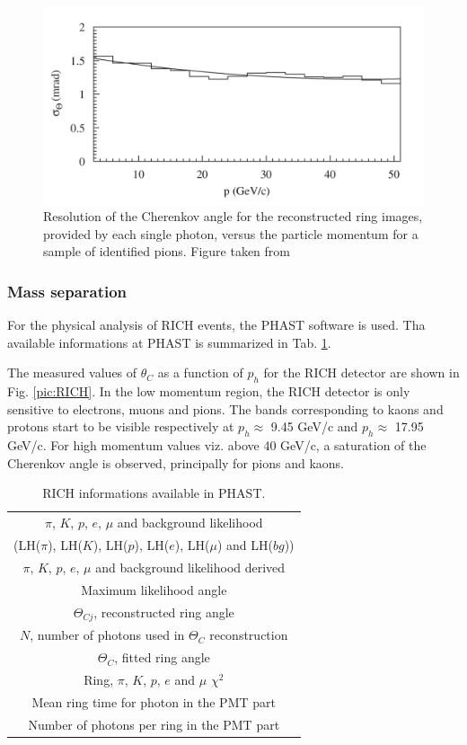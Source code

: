 \begin{figure}[!h]
  \centering
	\includegraphics[scale=0.5]{./gfx/RICHRez.png}
	\caption{Resolution of the Cherenkov angle for the reconstructed ring images, provided by each single photon, versus the particle momentum for a sample of identified pions. Figure taken from \cite{NIM}}
	\label{pic:RICHRez}
\end{figure}

\subsubsection*{Mass separation}

For the physical analysis of RICH events, the PHAST software is used. Tha available informations at PHAST is summarized in Tab. \ref{tab:RICHInfos}.

The measured values of $\theta_C$ as a function of $p_h$ for the RICH detector are shown in Fig. \ref{pic:RICH}. In the low momentum region, the RICH detector is only sensitive to electrons, muons and pions. The bands corresponding to kaons and protons start to be visible respectively at $p_h \approx$ 9.45 GeV/c and $p_h \approx$ 17.95 GeV/c. For high momentum values viz. above 40 GeV/c, a saturation of the Cherenkov angle is observed, principally for pions and kaons.

\begin{table}[!h]
  \caption{RICH informations available in PHAST.}
  \label{tab:RICHInfos}
  \centering
  \begin{tabular}{|c|}
    \hline
    $\pi$, $K$, $p$, $e$, $\mu$ and background likelihood \\
    (LH($\pi$), LH($K$), LH($p$), LH($e$), LH($\mu$) and LH($bg$)) \\
    $\pi$, $K$, $p$, $e$, $\mu$ and background likelihood derived\\
    Maximum likelihood angle \\
    $\Theta_{Cj}$, reconstructed ring angle \\
    $N$, number of photons used in $\Theta_C$ reconstruction \\
    $\Theta_{C}$, fitted ring angle \\
    Ring, $\pi$, $K$, $p$, $e$ and $\mu$ $\chi^2$ \\
    Mean ring time for photon in the PMT part \\
    Number of photons per ring in the PMT part \\
    \hline
  \end{tabular}
\end{table}

